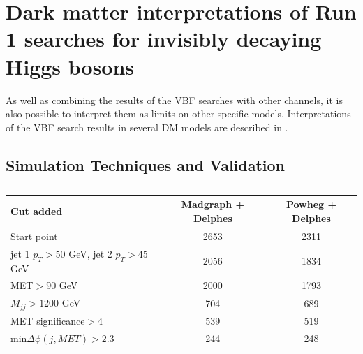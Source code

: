 \chapter{Dark matter interpretations of Run 1 searches for invisibly decaying Higgs bosons}
\label{chap:interp}
As well as combining the results of the \ac{VBF} searches with other channels, it is also possible to interpret them as limits on other specific models. Interpretations of the \ac{VBF} search results in several \ac{DM} models are described in .


\section{Simulation Techniques and Validation}
\label{sec:dmval}

\begin{table}
  \caption{}%
  \label{tab:mgvspowhegdelphes}
  \begin{tabular}{lcc}
    \hline
    \hline
    Cut added & Madgraph + Delphes & Powheg + Delphes \\
    \hline
    Start point & 2653 & 2311 \\
    jet 1 $p_{T}>50$ GeV, jet 2 $p_{T}>45$ GeV & 2056 & 1834 \\
    MET$>90$ GeV & 2000 & 1793 \\
    $M_{jj}>1200$ GeV & 704 & 689 \\
    MET significance$>4$ & 539 & 519 \\
    min$\Delta\phi(j,MET)>2.3$ & 244 & 248 \\
    \hline
    \hline
  \end{tabular}
\end{table}




